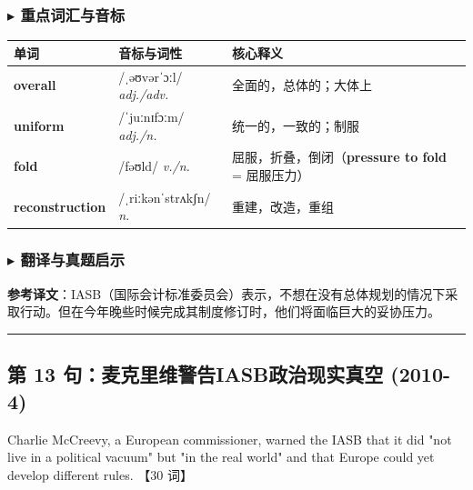 \documentclass[cn,normal,11pt]{elegantnote}
\newcommand{\retrokey}[1]{{\color{accentcolor}\textbf{#1}}}
\renewcommand{\citshape}{\kaishu\fontspec{Arial}}
\begin{document}
\subsubsection*{$\blacktriangleright$ 重点词汇与音标}
\noindent
\begin{tabularx}{\textwidth}{l X p{7cm}}
  \toprule
  \textbf{单词} & \textbf{音标与词性} & \textbf{核心释义} \\
  \midrule
  \retrokey{overall} & {\citshape /ˌəʊvərˈɔːl/} \textit{adj./adv.} & 全面的，总体的；大体上 \\
  \midrule
  \retrokey{uniform} & {\citshape /ˈjuːnɪfɔːm/} \textit{adj./n.} & 统一的，一致的；制服 \\
  \midrule
  \retrokey{fold} & {\citshape /fəʊld/} \textit{v./n.} & 屈服，折叠，倒闭（\textbf{pressure to fold} = 屈服压力） \\
  \midrule
  \retrokey{reconstruction} & {\citshape /ˌriːkənˈstrʌkʃn/} \textit{n.} & 重建，改造，重组 \\
  \bottomrule
\end{tabularx}

\subsubsection*{$\blacktriangleright$ 翻译与真题启示}
\begin{remark}
  \textbf{参考译文}：IASB（国际会计标准委员会）表示，不想在没有总体规划的情况下采取行动。但在今年晚些时候完成其制度修订时，他们将面临巨大的妥协压力。
\end{remark}

\par\vspace{10pt}\hrule\vspace{10pt}

\subsection{第 13 句：麦克里维警告IASB政治现实真空 (2010-4)}

\begin{note}
  Charlie McCreevy, a European commissioner, warned the IASB that it did "not live in a political vacuum" but "in the real world" and that Europe could yet develop different rules. 【30 词】
\end{note}
\end{document}
